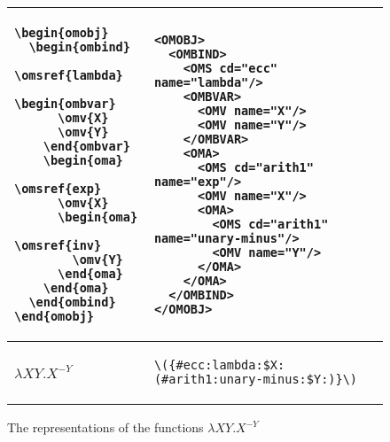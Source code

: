 \begin{figure}[htbp]
  \begin{center}
    \begin{tabular}{|l|l|}\hline
\begin{minipage}{3.5cm}\small
\begin{verbatim}
\begin{omobj}
  \begin{ombind}
    \omsref{lambda}
    \begin{ombvar}
      \omv{X}
      \omv{Y}
    \end{ombvar}
    \begin{oma}
      \omsref{exp}
      \omv{X}
      \begin{oma}
        \omsref{inv}
        \omv{Y}
      \end{oma}
    \end{oma}
  \end{ombind}
\end{omobj}
\end{verbatim}
\end{minipage}&
\begin{minipage}{8cm}\small
\begin{verbatim}
<OMOBJ>
  <OMBIND>
    <OMS cd="ecc" name="lambda"/>
    <OMBVAR>
      <OMV name="X"/>
      <OMV name="Y"/>
    </OMBVAR>
    <OMA>
      <OMS cd="arith1" name="exp"/>
      <OMV name="X"/>
      <OMA>
        <OMS cd="arith1" name="unary-minus"/>
        <OMV name="Y"/>
      </OMA>
    </OMA>
  </OMBIND>
</OMOBJ>
\end{verbatim}
\end{minipage}\\\hline
 $\lambda X Y.X^{-Y}$ & 
\begin{minipage}{9cm}
\begin{verbatim}
\({#ecc:lambda:$X:(#arith1:unary-minus:$Y:)}\)
\end{verbatim}
\end{minipage}\\\hline
  \end{tabular}
    \caption{The representations of the functions $\lambda X Y.X^{-Y}$}
    \label{fig:omabstr}
  \end{center}
\end{figure}

